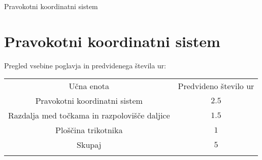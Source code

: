 \begin{priprava}{0}{}{}{Pravokotni koordinatni sistem}{}{}
    
    \chapter{Pravokotni koordinatni sistem}

    \Large{Pregled vsebine poglavja in predvidenega števila ur:}

    \begin{table}[H]
        \centering
        \begin{tabular}{||c|c||} 
        \hhline{|t:==:t|}
        \rowcolor[rgb]{0.843,0.718,0.718} 
        Učna enota  & Predvideno število ur   \\ 
        \hhline{|:==:|}
        Pravokotni koordinatni sistem & $2.5$    \\ 
        \hline
        Razdalja med točkama in razpolovišče daljice & $1.5$    \\ 
        \hline
        Ploščina  trikotnika & $1$    \\ 
        \hhline{|:==:|}
        Skupaj & $5$     \\
        \hhline{|b:==:b|}
        \end{tabular}
    \end{table}


    
\end{priprava}